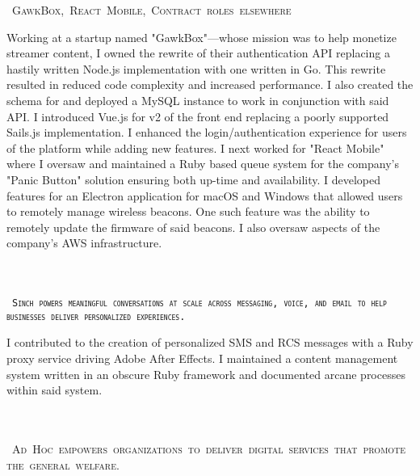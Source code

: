\documentclass{muratcan_cv}
\begin{document}
    \mbox { \scshape \hspace{1.2em} \tiny{GawkBox, React Mobile, Contract roles elsewhere}}\\
    \indent \indent \begin{minipage}{0.96\linewidth} \footnotesize
            Working at a startup named "GawkBox"—whose mission was to help monetize streamer content, I owned the rewrite of their authentication API replacing a hastily written Node.js implementation with one written in Go. This rewrite resulted in reduced code complexity and increased performance. I also created the schema for and deployed a MySQL instance to work in conjunction with said API. I introduced Vue.js for v2 of the front end replacing a poorly supported Sails.js implementation. I enhanced the login/authentication experience for users of the platform while adding new features. I next worked for "React Mobile" where I oversaw and maintained a Ruby based queue system for the company's "Panic Button" solution ensuring both up-time and availability. I developed features for an Electron application for macOS and Windows that allowed users to remotely manage wireless beacons. One such feature was the ability to remotely update the firmware of said beacons. I also oversaw aspects of the company's AWS infrastructure.
    \end{minipage} \\[0.1cm]\\
    \mbox { \scshape \hspace{1.2em} \tiny{\texttt{Sinch powers meaningful conversations at scale across
    messaging, voice, and email to help businesses deliver personalized experiences.}}}\\
    \indent \indent \begin{minipage}{0.96\linewidth} \footnotesize
     I contributed to the creation of personalized SMS and RCS messages with a Ruby proxy service driving Adobe After Effects. I maintained a content management system written in an obscure Ruby framework and documented arcane processes within said system.
    \end{minipage} \\[0.1cm]\\
    \mbox { \scshape \hspace{1.2em} \tiny{Ad Hoc empowers organizations to deliver digital
    services that promote the general welfare.}}\\
\end{document}
